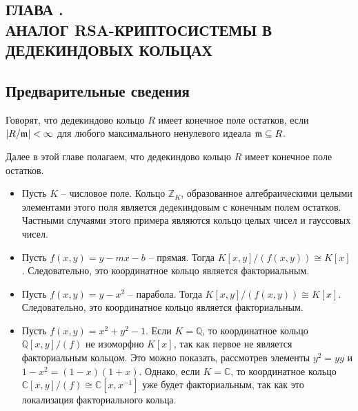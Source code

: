 \documentclass[_00_dissertation.tex]{subfiles}
\begin{document}
\onlyinsubfile{
    \renewcommand{\contentsname}{ОГЛАВЛЕНИЕ}
    \setcounter{tocdepth}{3}
    \tableofcontents
}

\newpage
\begin{center}
    \section*{ГЛАВА .\\ АНАЛОГ RSA-КРИПТОСИСТЕМЫ В ДЕДЕКИНДОВЫХ КОЛЬЦАХ}\label{ch:RSA-cryptosystem}
\end{center}

\subsection{Предварительные сведения}

\begin{definition}
    Говорят, что дедекиндово кольцо $R$ имеет конечное поле остатков, если $|R/\mathfrak{m}| < \infty$ для любого максимального ненулевого идеала $\mathfrak{m} \subseteq R$.
\end{definition}

Далее в этой главе полагаем, что дедекиндово кольцо $R$ имеет конечное поле остатков.

\begin{example}
    \begin{itemize}
        \item Пусть $K$ -- числовое поле.
        Кольцо $\mathbb{Z}_K$, образованное алгебраическими целыми элементами этого поля является дедекиндовым с конечным полем остатков.
        Частными случаями этого примера являются кольцо целых чисел и гауссовых чисел.
        
        \item Пусть $f(x, y) = y - mx - b$ -- прямая.
        Тогда $K[x, y]/(f(x, y)) \cong K[x]$.
        Следовательно, это координатное кольцо является факториальным.
        
        \item Пусть $f(x, y) = y - x^2$ -- парабола.
        Тогда $K[x, y]/(f(x, y)) \cong K[x]$.
        Следовательно, это координатное кольцо является факториальным.
    
        \item Пусть $f(x, y) = x^2 + y^2 - 1$.
        Если $K = \mathbb{Q}$, то координатное кольцо $\mathbb{Q}[x, y]/(f)$ не изоморфно $K[x]$, так как первое не является факториальным кольцом.
        Это можно показать, рассмотрев элементы $y^2 = yy$ и $1-x^2 = (1-x)(1+x)$.
        Однако, если $K = \mathbb{C}$, то координатное кольцо $\mathbb{C}[x, y]/(f) \cong \mathbb{C}[x, x^{-1}]$ уже будет факториальным, так как это локализация факториального кольца.
    \end{itemize}
\end{example}
\end{document}
